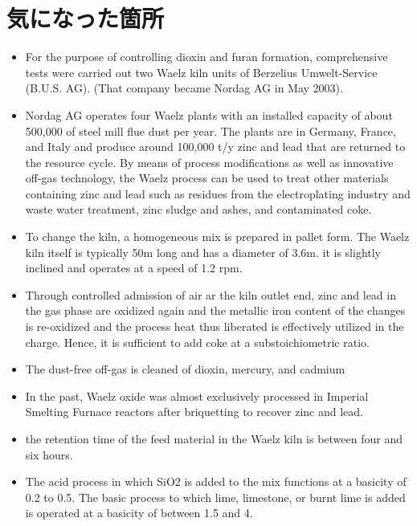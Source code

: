 \documentclass[a4j]{jsarticle}
\begin{document}
\section{気になった箇所}
\begin{itemize}
\item
For the purpose of controlling dioxin and furan formation, comprehensive tests were carried out two Waelz kiln units of Berzelius Umwelt-Service (B.U.S. AG). (That company became Nordag AG in May 2003).

\item
Nordag AG operates four Waelz plants with an installed capacity of about 500,000 of steel mill flue dust per year. The plants are in Germany, France, and Italy and produce around 100,000 t/y zinc and lead that are returned to the resource cycle. By means of process modifications as well as innovative off-gas technology, the Waelz process can be used to treat other materials containing zinc and lead such as residues from the electroplating industry and waste water treatment, zinc sludge and ashes, and contaminated coke.

\item
To change the kiln, a homogeneous mix is prepared in pallet form. The Waelz kiln itself is typically 50m long and has a diameter of 3.6m. it is slightly inclined and operates at a speed of 1.2 rpm.

\item
Through controlled admission of air ar the kiln outlet end, zinc and lead in the gas phase are oxidized again and the metallic iron content of the changes is re-oxidized and the process heat thus liberated is effectively utilized in the charge. Hence, it is sufficient to add coke at a substoichiometric ratio.

\item
The dust-free off-gas is cleaned of dioxin, mercury, and cadmium

\item
In the past, Waelz oxide was almost exclusively processed in Imperial Smelting Furnace reactors after briquetting to recover zinc and lead.

\item
the retention time of the feed material in the Waelz kiln is between four and six hours.

\item
The acid process in which SiO2 is added to the mix functions at a basicity of 0.2 to 0.5. The basic process to which lime, limestone, or burnt lime is added is operated at a basicity of between 1.5 and 4.


\end{itemize}
\end{document}
